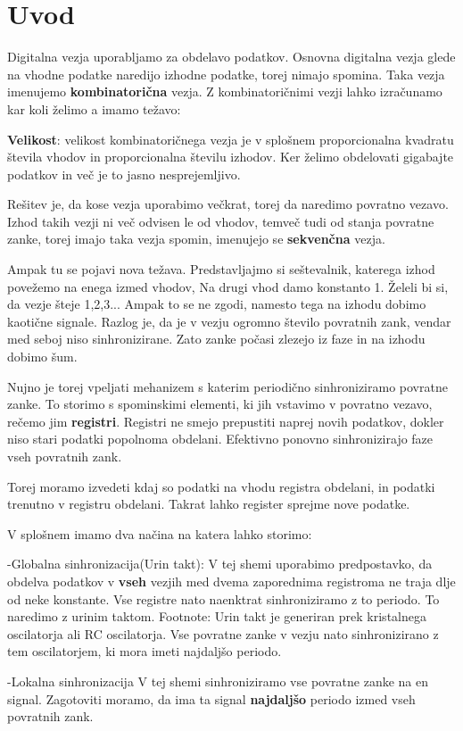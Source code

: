 \chapter{Uvod} \label{uvod}

Digitalna vezja uporabljamo za obdelavo podatkov. Osnovna digitalna vezja glede na vhodne podatke naredijo izhodne podatke, torej nimajo spomina. Taka vezja imenujemo \textbf{kombinatorična} vezja.
Z kombinatoričnimi vezji lahko izračunamo kar koli želimo a imamo težavo:

\textbf{Velikost}: velikost kombinatoričnega vezja je v splošnem proporcionalna kvadratu števila vhodov in proporcionalna številu izhodov. Ker želimo obdelovati gigabajte podatkov in več je to jasno nesprejemljivo.

Rešitev je, da kose vezja uporabimo večkrat, torej da naredimo povratno vezavo. Izhod takih vezji ni več odvisen le od vhodov, temveč tudi od stanja povratne zanke, torej imajo taka vezja spomin, imenujejo se \textbf{sekvenčna} vezja.

Ampak tu se pojavi nova težava. Predstavljajmo si seštevalnik, katerega izhod povežemo na enega izmed vhodov, Na drugi vhod damo konstanto 1.
Želeli bi si, da vezje šteje 1,2,3... Ampak to se ne zgodi, namesto tega na izhodu dobimo kaotične signale. Razlog je, da je v vezju ogromno število povratnih zank, vendar med seboj niso sinhronizirane. Zato zanke počasi zlezejo iz faze in na izhodu dobimo šum.

Nujno je torej vpeljati mehanizem s katerim periodično sinhroniziramo povratne zanke. To storimo s spominskimi elementi, ki jih vstavimo v povratno vezavo, rečemo jim \textbf{registri}. Registri ne smejo prepustiti naprej novih podatkov, dokler niso stari podatki popolnoma obdelani. Efektivno ponovno sinhronizirajo faze vseh povratnih zank.

Torej moramo izvedeti kdaj so podatki na vhodu registra obdelani, in podatki trenutno v registru obdelani. Takrat lahko register sprejme nove podatke.

V splošnem imamo dva načina na katera lahko storimo:

-Globalna sinhronizacija(Urin takt):
	V tej shemi uporabimo predpostavko, da obdelva podatkov v \textbf{vseh} vezjih med dvema zaporednima registroma ne traja dlje od neke konstante. Vse registre nato naenktrat sinhroniziramo z to periodo. To naredimo z urinim taktom. Footnote: Urin takt je generiran prek kristalnega oscilatorja ali RC oscilatorja. Vse povratne zanke v vezju nato sinhronizirano z tem oscilatorjem, ki mora imeti najdaljšo periodo.
	
-Lokalna sinhronizacija
	V tej shemi sinhroniziramo vse povratne zanke na en signal. Zagotoviti moramo, da ima ta signal \textbf{najdaljšo} periodo izmed vseh povratnih zank. 




	
